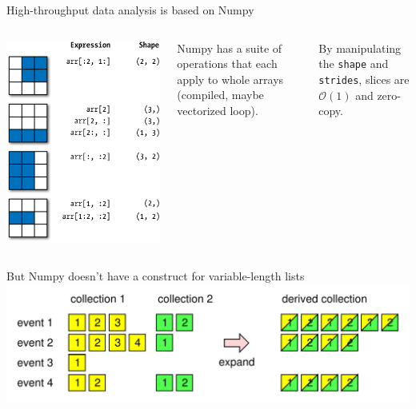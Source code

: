 \documentclass[aspectratio=169]{beamer}
\begin{document}
\begin{frame}{High-throughput data analysis is based on Numpy}
\Large
\vspace{0.5 cm}
\begin{columns}
\includegraphics[width=\linewidth]{numpy-slicing.png}

Numpy has a suite of operations that each apply to whole arrays (compiled, maybe vectorized loop).

\vspace{1 cm}

By manipulating the {\tt shape} and {\tt strides}, slices are $\mathcal{O}(1)$ and zero-copy.
\end{columns}
\end{frame}

\begin{frame}{But Numpy doesn't have a construct for variable-length lists}
\Large
\vspace{0.5 cm}
\includegraphics[width=\linewidth]{two-collections.pdf}

\vspace{0.5 cm}
\end{frame}
\end{document}
